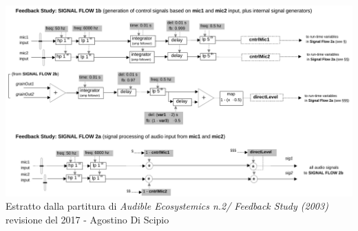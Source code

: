 \begin{center}
\includegraphics[width=14cm]{figures/LARfeedbackstudy2017.pdf} \\
{Estratto dalla partitura di \textit{Audible Ecosystemics n.2/ Feedback Study (2003)} \\
revisione del 2017 - Agostino Di Scipio} \\ 
\vspace{0.5cm}
\end{center}
